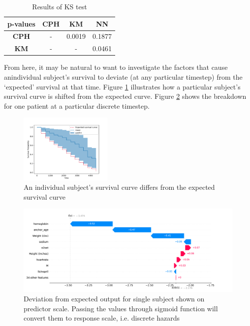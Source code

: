 \documentclass[%
 reprint,
 amsmath,amssymb,
 aps,nofootinbib
]{revtex4-2}
\begin{document}
\begin{table}[H]
  \centering
  \begin{tabular}{|c|c|c|c|}
  \hline
  \textbf{p-values}&\textbf{CPH}&\textbf{KM}&\textbf{NN}\\
  \hline
  \textbf{CPH}&-&0.0019&0.1877\\
  \hline
  \textbf{KM}&-&-&0.0461\\
  \hline
  \end{tabular}
  \caption{Results of KS test}
  \label{tab:kstest}
\end{table}

From here, it may be natural to want to investigate the factors that cause anindividual subject's survival to deviate (at any particular timestep) from the `expected' survival at that time. Figure \ref{fig:diff_exp_curve} illustrates how a particular subject's survival curve is shifted from the expected curve. Figure \ref{fig:shap} shows the breakdown for one patient at a particular discrete timestep. \\


\begin{figure}
  \centering
  \includegraphics[width=0.4\textwidth]{diff_exp_curve.pdf}
  \caption{An individual subject's survival curve differs from the expected survival curve}
  \label{fig:diff_exp_curve}
\end{figure}

\begin{figure}
  \centering
  \includegraphics[width=\textwidth]{shap_fig.pdf}
  \caption{Deviation from expected output for single subject shown on predictor scale. Passing the values through sigmoid function will convert them to response scale, i.e. discrete hazards}
  \label{fig:shap}
\end{figure}
\end{document}
